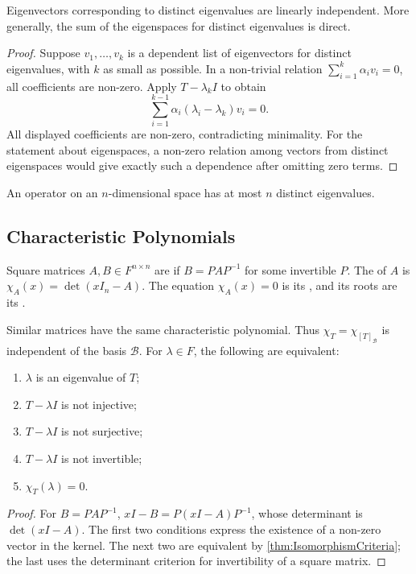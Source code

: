 \begin{Theorem}\label{thm:DistinctEigenvalues}
Eigenvectors corresponding to distinct eigenvalues are linearly independent. More generally, the sum of the eigenspaces for distinct eigenvalues is direct.
\end{Theorem}
\begin{proof}
Suppose $v_1,\ldots,v_k$ is a dependent list of eigenvectors for distinct eigenvalues, with $k$ as small as possible. In a non-trivial relation $\sum_{i=1}^k\alpha_iv_i=0$, all coefficients are non-zero. Apply $T-\lambda_k I$ to obtain
\begin{equation*}
\sum_{i=1}^{k-1}\alpha_i(\lambda_i-\lambda_k)v_i=0.
\end{equation*}
All displayed coefficients are non-zero, contradicting minimality. For the statement about eigenspaces, a non-zero relation among vectors from distinct eigenspaces would give exactly such a dependence after omitting zero terms.
\end{proof}

\begin{Corollary}
An operator on an $n$-dimensional space has at most $n$ distinct eigenvalues.
\end{Corollary}

\subsection{Characteristic Polynomials}

\begin{Definition}
Square matrices $A,B\in F^{n\times n}$ are  if $B=PAP^{-1}$ for some invertible $P$. The  of $A$ is $\chi_A(x)=\det(xI_n-A)$. The equation $\chi_A(x)=0$ is its , and its roots are its .
\end{Definition}

\begin{Theorem}
Similar matrices have the same characteristic polynomial. Thus $\chi_T=\chi_{[T]_{\mathcal B}}$ is independent of the basis $\mathcal B$. For $\lambda\in F$, the following are equivalent:
\begin{enumerate}[label=(\roman*)]
\item $\lambda$ is an eigenvalue of $T$;
\item $T-\lambda I$ is not injective;
\item $T-\lambda I$ is not surjective;
\item $T-\lambda I$ is not invertible;
\item $\chi_T(\lambda)=0$.
\end{enumerate}
\end{Theorem}
\begin{proof}
For $B=PAP^{-1}$, $xI-B=P(xI-A)P^{-1}$, whose determinant is $\det(xI-A)$. The first two conditions express the existence of a non-zero vector in the kernel. The next two are equivalent by \cref{thm:IsomorphismCriteria}; the last uses the determinant criterion for invertibility of a square matrix.
\end{proof}

